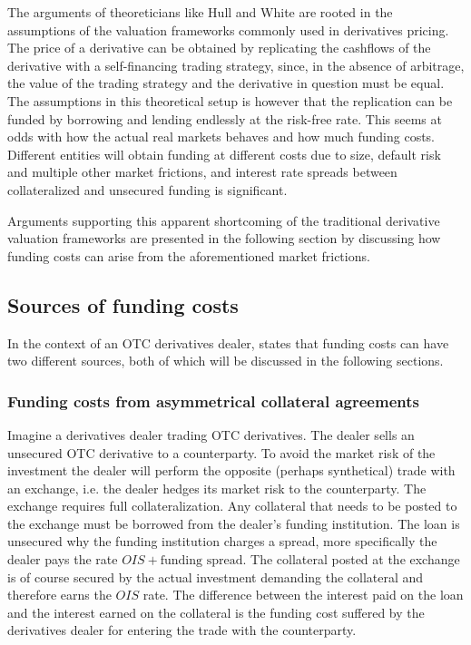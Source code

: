 \documentclass[../main.tex]{subfiles}
\begin{document}
        The arguments of theoreticians like Hull and White are rooted in the assumptions of the valuation frameworks commonly used in derivatives pricing. The price of a derivative can be obtained by replicating the cashflows of the derivative with a self-financing trading strategy, since, in the absence of arbitrage, the value of the trading strategy and the derivative in question must be equal. The assumptions in this theoretical setup is however that the replication can be funded by borrowing and lending endlessly at the risk-free rate. This seems at odds with how the actual real markets behaves and how much funding costs. Different entities will obtain funding at different costs due to size, default risk and multiple other market frictions, and interest rate spreads between collateralized and unsecured funding is significant.

        Arguments supporting this apparent shortcoming of the traditional derivative valuation frameworks are presented in the following section by discussing how funding costs can arise from the aforementioned market frictions.

    \subsection{Sources of funding costs}
    In the context of an OTC derivatives dealer, \cite{Ruiz2013FVA} states that funding costs can have two different sources, both of which will be discussed in the following sections. 

    \subsubsection{Funding costs from asymmetrical collateral agreements}
        Imagine a derivatives dealer trading OTC derivatives. The dealer sells an unsecured OTC derivative to a counterparty. To avoid the market risk of the investment the dealer will perform the opposite (perhaps synthetical) trade with an exchange, i.e. the dealer hedges its market risk to the counterparty. The exchange requires full collateralization. Any collateral that needs to be posted to the exchange must be borrowed from the dealer's funding institution. The loan is unsecured why the funding institution charges a spread, more specifically the dealer pays the rate $OIS + \text{funding spread}$. The collateral posted at the exchange is of course secured by the actual investment demanding the collateral and therefore earns the $OIS$ rate. The difference between the interest paid on the loan and the interest earned on the collateral is the funding cost suffered by the derivatives dealer for entering the trade with the counterparty. 
\end{document}
